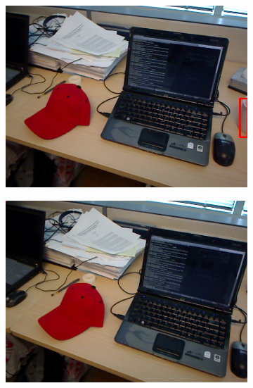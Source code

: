 \begin{figure}
	\begin{subfigure}[b]{0.3\textwidth}
		\includegraphics[width=\textwidth]{img/seguimiento_frame_template/frame_template-desk_1-coffee_mug_5-frame_32.png}
	\end{subfigure}
	\begin{subfigure}[b]{0.3\textwidth}
		\includegraphics[width=\textwidth]{img/seguimiento_frame_template/frame_template-desk_1-coffee_mug_5-frame_33.png}
	\end{subfigure}
	\begin{subfigure}[b]{0.3\textwidth}

\end{subfigure}
\end{figure}
